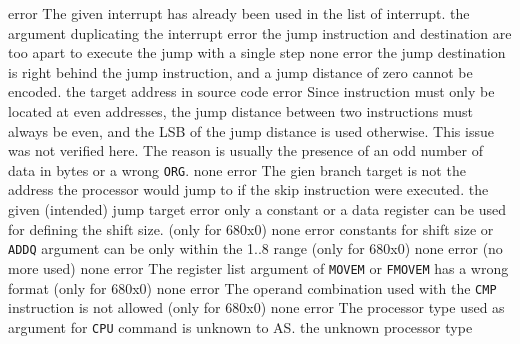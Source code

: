 \documentclass[12pt,twoside]{report}
\newcommand{\tty}[1]{{\tt #1}}
\newcommand{\asname}{{AS}}
\begin{document}
\begin{description}
               {error}
               {The given interrupt has already been used in the list of interrupt.}
               {the argument duplicating the interrupt}
               {error}
               {the jump instruction and destination are too apart to
                execute the jump with a single step}
               {none}
               {error}
               {the jump destination is right behind the jump instruction,
                and a jump distance of zero cannot be encoded.}
               {the target address in source code}
               {error}
               {Since instruction must only be located at even addresses,
                the jump distance between two instructions must always be
                even, and the LSB of the jump distance is used otherwise.
                This issue was not verified here. The reason is usually the
                presence of an odd number of data in bytes or a wrong
                \tty{ORG}.}
               {none}
               {error}
               {The gien branch target is not the address the processor would
                jump to if the skip instruction were executed.}
               {the given (intended) jump target}
               {error}
               {only a constant or a data register can be used for defining
                the shift size. (only for 680x0)}
               {none}
               {error}
               {constants for shift size or \tty{ADDQ} argument can be only
                within the 1..8 range (only for 680x0)}
               {none}
               {error}
               {(no more used)}
               {none}
               {error}
               {The register list argument of \tty{MOVEM} or \tty{FMOVEM} has a
                wrong format (only for 680x0)}
               {none}
               {error}
               {The operand combination used with the \tty{CMP} instruction is
                not allowed (only for 680x0)}
               {none}
               {error}
               {The processor type used as argument for \tty{CPU} command is
                unknown to \asname{}.}
               {the unknown processor type}

\end{description}
\end{document}
